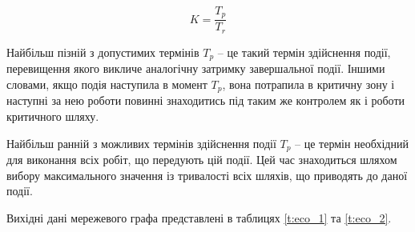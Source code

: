 \begin{equation}
	K=\frac{T_{p}}{T_{r}}
\end{equation}

\par Найбільш пізній з допустимих термінів $T_{p}$ -- це такий термін здійснення події, перевищення якого викличе аналогічну затримку завершальної події. Іншими словами, якщо подія наступила в момент $T_{p}$, вона потрапила в критичну зону і наступні за нею роботи повинні знаходитись під таким же контролем як і роботи критичного шляху.

\par Найбільш ранній з можливих термінів здійснення події $T_{p}$ -- це термін необхідний для виконання всіх робіт, що передують цій події. Цей час знаходиться шляхом вибору максимального значення із тривалості всіх шляхів, що приводять до даної події.
\par Вихідні дані мережевого графа представлені в таблицях \ref{t:eco_1} та \ref{t:eco_2}.


